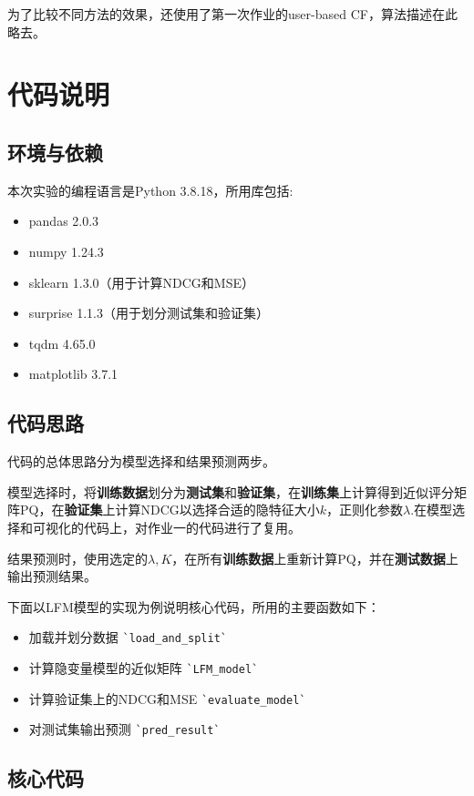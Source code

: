\documentclass[12pt, a4paper]{ctexart}
\begin{document}
为了比较不同方法的效果，还使用了第一次作业的user-based CF，算法描述在此略去。

\section{代码说明}

\subsection{环境与依赖}
本次实验的编程语言是Python 3.8.18，所用库包括:
\begin{itemize}
    \item pandas 2.0.3
    \item numpy 1.24.3
    \item sklearn 1.3.0（用于计算NDCG和MSE）
    \item surprise 1.1.3（用于划分测试集和验证集）
    \item tqdm 4.65.0
    \item matplotlib 3.7.1
\end{itemize}

\subsection{代码思路}

代码的总体思路分为模型选择和结果预测两步。

模型选择时，将\textbf{训练数据}划分为\textbf{测试集}和\textbf{验证集}，在\textbf{训练集}上计算得到近似评分矩阵PQ，在\textbf{验证集}上计算NDCG以选择合适的隐特征大小$k$，正则化参数$\lambda$.在模型选择和可视化的代码上，对作业一的代码进行了复用。

结果预测时，使用选定的$\lambda,K$，在所有\textbf{训练数据}上重新计算PQ，并在\textbf{测试数据}上输出预测结果。

下面以LFM模型的实现为例说明核心代码，所用的主要函数如下：

\begin{itemize}
    \item 加载并划分数据 \verb|`load_and_split`|
    \item 计算隐变量模型的近似矩阵 \verb|`LFM_model`|
    \item 计算验证集上的NDCG和MSE  \verb|`evaluate_model`|
    \item 对测试集输出预测 \verb|`pred_result`|
\end{itemize}

\subsection{核心代码}
\end{document}
